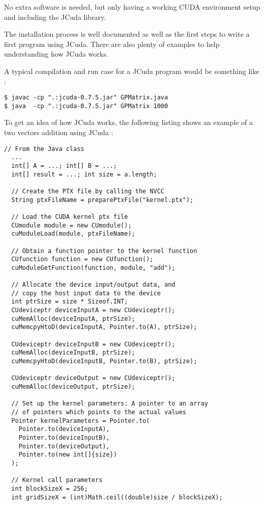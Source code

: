 No extra software is needed, but only having a working CUDA environment setup and including the JCuda library.

The installation process is well documented as well as the first steps to write a first program using JCuda. There are also plenty of examples to help understanding how JCuda works.

A typical compilation and run case for a JCuda program would be something like :
\begin{lstlisting}
$ javac -cp ".:jcuda-0.7.5.jar" GPMatrix.java
$ java  -cp ".:jcuda-0.7.5.jar" GPMatrix 1000
\end{lstlisting}

To get an idea of how JCuda works, the following listing shows an example of a two vectors addition using JCuda :

\begin{lstlisting}
// From the Java class
  ...
  int[] A = ...; int[] B = ...;
  int[] result = ...; int size = a.length;
  
  // Create the PTX file by calling the NVCC
  String ptxFileName = preparePtxFile("kernel.ptx");
  
  // Load the CUDA kernel ptx file
  CUmodule module = new CUmodule();
  cuModuleLoad(module, ptxFileName);

  // Obtain a function pointer to the kernel function
  CUfunction function = new CUfunction();
  cuModuleGetFunction(function, module, "add");

  // Allocate the device input/output data, and 
  // copy the host input data to the device
  int ptrSize = size * Sizeof.INT;
  CUdeviceptr deviceInputA = new CUdeviceptr();
  cuMemAlloc(deviceInputA, ptrSize);
  cuMemcpyHtoD(deviceInputA, Pointer.to(A), ptrSize);

  CUdeviceptr deviceInputB = new CUdeviceptr();
  cuMemAlloc(deviceInputB, ptrSize);
  cuMemcpyHtoD(deviceInputB, Pointer.to(B), ptrSize);

  CUdeviceptr deviceOutput = new CUdeviceptr();
  cuMemAlloc(deviceOutput, ptrSize);

  // Set up the kernel parameters: A pointer to an array
  // of pointers which points to the actual values
  Pointer kernelParameters = Pointer.to(
    Pointer.to(deviceInputA),
    Pointer.to(deviceInputB),
    Pointer.to(deviceOutput),
    Pointer.to(new int[]{size})
  );

  // Kernel call parameters
  int blockSizeX = 256;
  int gridSizeX = (int)Math.ceil((double)size / blockSizeX);


\end{lstlisting}
